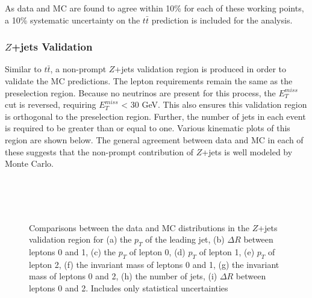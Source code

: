 As data and MC are found to agree within 10\% for each of these working points, a 10\% systematic uncertainty on the $t\bar{t}$ prediction is included for the analysis.

\subsubsection{$Z$+jets Validation}

Similar to $t\bar{t}$, a non-prompt $Z$+jets validation region is produced in order to validate the MC predictions. The lepton requirements remain the same as the preselection region. Because no neutrinos are present for this process, the $E_T^{miss}$ cut is reversed, requiring $E_T^{miss}$ < 30 GeV. This also ensures this validation region is orthogonal to the preselection region. Further, the number of jets in each event is required to be greater than or equal to one. Various kinematic plots of this region are shown below. The general agreement between data and MC in each of these suggests that the non-prompt contribution of $Z$+jets is well modeled by Monte Carlo.

\begin{figure}[H]
    \\
    \\
    \\
    \caption{Comparisons between the data and MC distributions in the $Z$+jets validation region for (a) the $p_T$ of the leading jet, (b) $\Delta R$ between leptons 0 and 1, (c) the $p_T$ of lepton 0, (d) $p_T$ of lepton 1, (e) $p_T$ of lepton 2, (f) the invariant mass of leptons 0 and 1, (g) the invariant mass of leptons 0 and 2, (h) the number of jets, (i) $\Delta R$ between leptons 0 and 2. Includes only statistical uncertainties}%
    \label{fig:zjets_noScale}
\end{figure}

